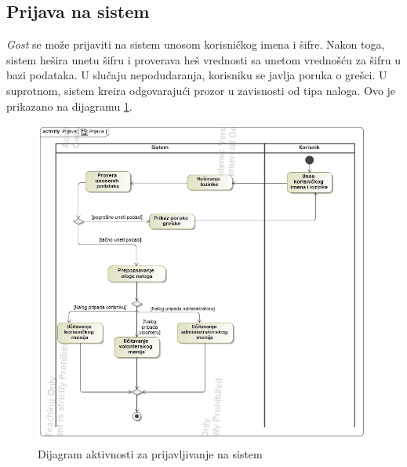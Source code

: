 \subsection{Prijava na sistem}
\par \textit{Gost} se može prijaviti na sistem unosom korisničkog imena i šifre. Nakon toga, sistem hešira unetu šifru i proverava heš vrednosti sa
unetom vrednošću za šifru u bazi podataka. U slučaju nepodudaranja, korisniku se javlja poruka o grešci. U suprotnom, sistem kreira odgovarajući prozor u zavisnosti
od tipa naloga. Ovo je prikazano na dijagramu \ref{fig:login}.
\begin{figure}[ht]
    \centering
    \includegraphics[width=\textwidth, height=\textwidth]{img/login.jpg}
    \caption{Dijagram aktivnosti za prijavljivanje na sistem}
    \label{fig:login}
\end{figure}
